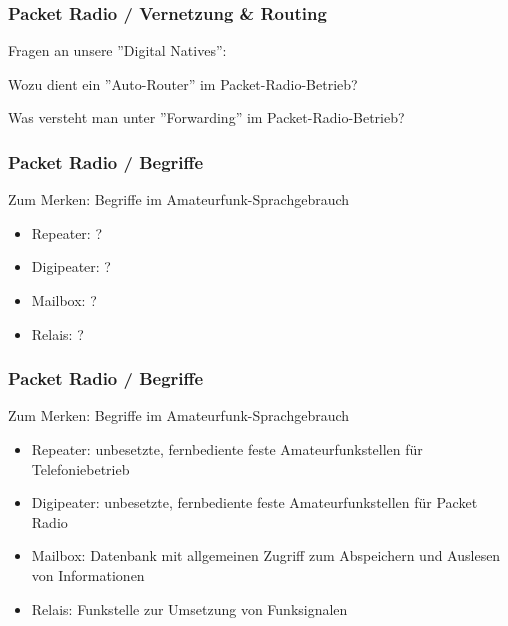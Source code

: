 \begin{frame}
    \frametitle{Packet Radio / Vernetzung \& Routing}

    Fragen an unsere ''Digital Natives'': \\[2em]

    \begin{block}{Wozu dient ein ''Auto-Router'' im Packet-Radio-Betrieb?}
    \end{block}
        \begin{block}{Was versteht man unter ''Forwarding'' im
        Packet-Radio-Betrieb?}
    \end{block}

\end{frame}

\begin{frame}
    \frametitle{Packet Radio / Begriffe}

    \begin{block}{Zum Merken: Begriffe im Amateurfunk-Sprachgebrauch}
        \begin{itemize}
            \item Repeater: ?
            \item Digipeater: ?
            \item Mailbox: ?
            \item Relais: ?
        \end{itemize}
    \end{block}

\end{frame}

\begin{frame}
    \frametitle{Packet Radio / Begriffe}

    \begin{block}{Zum Merken: Begriffe im Amateurfunk-Sprachgebrauch}
        \begin{itemize}
            \item Repeater: unbesetzte, fernbediente feste Amateurfunkstellen für
                  Telefoniebetrieb
            \item Digipeater: unbesetzte, fernbediente feste Amateurfunkstellen für Packet
                  Radio
            \item Mailbox: Datenbank mit allgemeinen Zugriff zum Abspeichern und Auslesen
                  von Informationen
            \item Relais: Funkstelle zur Umsetzung von Funksignalen
        \end{itemize}
    \end{block}

\end{frame}

